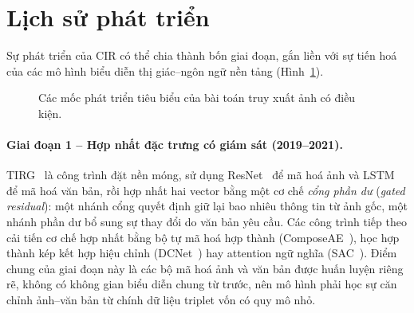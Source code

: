 \section{Lịch sử phát triển}\label{sec:history}

Sự phát triển của CIR có thể chia thành bốn giai đoạn, gắn liền với sự tiến hoá của các mô hình biểu diễn thị giác--ngôn ngữ nền tảng (Hình~\ref{fig:cir-timeline}).

\begin{figure}[h]
\centering
{}
\caption{Các mốc phát triển tiêu biểu của bài toán truy xuất ảnh có điều kiện.}
\label{fig:cir-timeline}
\end{figure}

\paragraph{Giai đoạn 1 -- Hợp nhất đặc trưng có giám sát (2019--2021).} TIRG~\cite{vo2019tirg} là công trình đặt nền móng, sử dụng ResNet~\cite{he2016resnet} để mã hoá ảnh và LSTM để mã hoá văn bản, rồi hợp nhất hai vector bằng một cơ chế \emph{cổng phần dư} (\emph{gated residual}): một nhánh cổng quyết định giữ lại bao nhiêu thông tin từ ảnh gốc, một nhánh phần dư bổ sung sự thay đổi do văn bản yêu cầu. Các công trình tiếp theo cải tiến cơ chế hợp nhất bằng bộ tự mã hoá hợp thành (ComposeAE~\cite{anwaar2021composeae}), học hợp thành kép kết hợp hiệu chỉnh (DCNet~\cite{kim2021dcnet}) hay attention ngữ nghĩa (SAC~\cite{jandial2022sac}). Điểm chung của giai đoạn này là các bộ mã hoá ảnh và văn bản được huấn luyện riêng rẽ, không có không gian biểu diễn chung từ trước, nên mô hình phải học sự căn chỉnh ảnh--văn bản từ chính dữ liệu triplet vốn có quy mô nhỏ.

